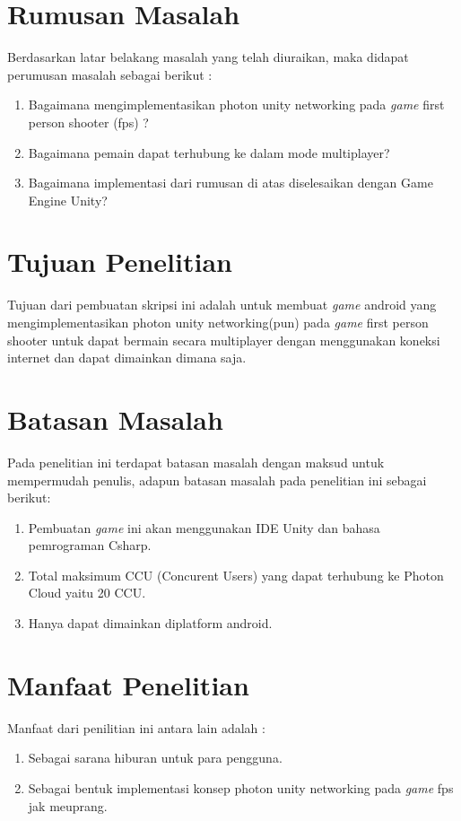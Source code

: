 \section{Rumusan Masalah}
\noindent

Berdasarkan latar belakang masalah yang telah diuraikan, maka didapat perumusan masalah sebagai berikut :
\begin{enumerate}
	\item Bagaimana mengimplementasikan photon unity networking pada \textit{game} first person shooter (fps) ?
	\item Bagaimana pemain dapat terhubung ke dalam mode multiplayer?
	\item Bagaimana implementasi dari rumusan di atas diselesaikan 
	dengan Game Engine Unity?
	\end{enumerate}	
\section{Tujuan Penelitian}
\noindent

Tujuan dari pembuatan skripsi ini adalah untuk membuat \textit{game} android yang mengimplementasikan photon unity networking(pun) pada \textit{game} first person shooter untuk dapat bermain secara multiplayer dengan menggunakan koneksi internet dan dapat dimainkan dimana saja.

\section{Batasan Masalah}
Pada penelitian ini terdapat batasan masalah dengan maksud untuk mempermudah penulis, adapun batasan masalah pada penelitian ini sebagai berikut:
\begin{enumerate}
	\item Pembuatan \textit{game} ini akan menggunakan IDE Unity dan bahasa pemrograman Csharp.
	\item Total maksimum CCU (Concurent Users) yang dapat terhubung ke Photon Cloud yaitu 20 CCU.
	\item Hanya dapat dimainkan diplatform android.
\end{enumerate}

\section{Manfaat Penelitian}
Manfaat dari penilitian ini antara lain adalah : 
\begin{enumerate}
	\item Sebagai sarana hiburan untuk para pengguna.
	\item Sebagai bentuk implementasi konsep photon unity networking pada \textit{game} fps jak meuprang.
\end{enumerate}
